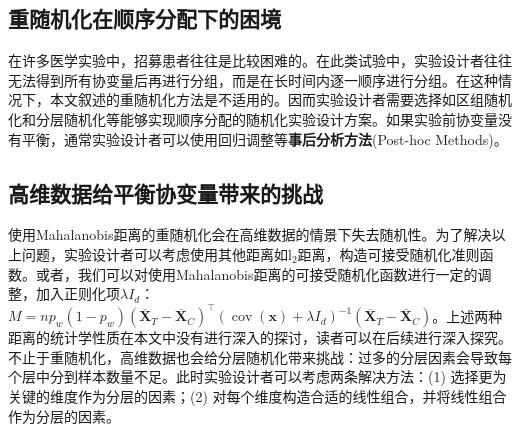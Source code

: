 \subsection{重随机化在顺序分配下的困境}

    在许多医学实验中，招募患者往往是比较困难的。在此类试验中，实验设计者往往无法得到所有协变量后再进行分组，而是在长时间内逐一顺序进行分组。在这种情况下，本文叙述的重随机化方法是不适用的。因而实验设计者需要选择如区组随机化和分层随机化等能够实现顺序分配的随机化实验设计方案。如果实验前协变量没有平衡，通常实验设计者可以使用回归调整等\textbf{事后分析方法}(Post-hoc Methods)。
    
\subsection{高维数据给平衡协变量带来的挑战}
    使用Mahalanobis距离的重随机化会在高维数据的情景下失去随机性。为了解决以上问题，实验设计者可以考虑使用其他距离如$\mathrm{l}_2$距离，构造可接受随机化准则函数。或者，我们可以对使用Mahalanobis距离的可接受随机化函数进行一定的调整，加入正则化项$\lambda I_d$：$M=n p_w\left(1-p_w\right)\left(\overline{\mathbf{X}}_T-\overline{\mathbf{X}}_C\right)^{\top} \left(\operatorname{cov}(\mathbf{x})+\lambda I_d\right)^{-1}\left(\overline{\mathbf{X}}_T-\overline{\mathbf{X}}_C\right)$。上述两种距离的统计学性质在本文中没有进行深入的探讨，读者可以在后续进行深入探究。不止于重随机化，高维数据也会给分层随机化带来挑战：过多的分层因素会导致每个层中分到样本数量不足。此时实验设计者可以考虑两条解决方法：(1) 选择更为关键的维度作为分层的因素；(2) 对每个维度构造合适的线性组合，并将线性组合作为分层的因素。
    

